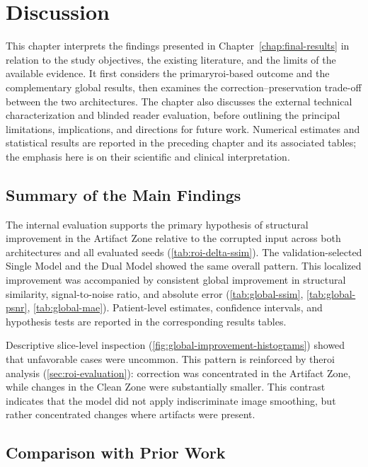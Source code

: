\chapter{Discussion}
\label{chap:final-discussion}

This chapter interprets the findings presented in Chapter~\ref{chap:final-results} in relation to the study objectives, the existing literature, and the limits of the available evidence. It first considers the primary\acrshort{roi}-based outcome and the complementary global results, then examines the correction--preservation trade-off between the two architectures. The chapter also discusses the external technical characterization and blinded reader evaluation, before outlining the principal limitations, implications, and directions for future work. Numerical estimates and statistical results are reported in the preceding chapter and its associated tables; the emphasis here is on their scientific and clinical interpretation.

\section{Summary of the Main Findings}

 The internal evaluation supports the primary hypothesis of structural improvement in the Artifact Zone relative to the corrupted input across both architectures and all evaluated seeds (\autoref{tab:roi-delta-ssim}). The validation-selected Single Model and the Dual Model showed the same overall pattern. This localized improvement was accompanied by consistent global improvement in structural similarity, signal-to-noise ratio, and absolute error (\autoref{tab:global-ssim}, \autoref{tab:global-psnr}, \autoref{tab:global-mae}). Patient-level estimates, confidence intervals, and hypothesis tests are reported in the corresponding results tables.

 Descriptive slice-level inspection (\autoref{fig:global-improvement-histograms}) showed that unfavorable cases were uncommon. This pattern is reinforced by the\acrshort{roi} analysis (\autoref{sec:roi-evaluation}): correction was concentrated in the Artifact Zone, while changes in the Clean Zone were substantially smaller. This contrast indicates that the model did not apply indiscriminate image smoothing, but rather concentrated changes where artifacts were present.

\section{Comparison with Prior Work}

